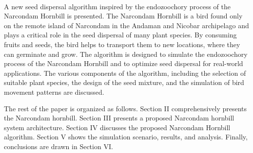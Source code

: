 \documentclass[conference]{IEEEtran}
\begin{document}
\\A new seed dispersal algorithm inspired by the endozoochory process of the Narcondam Hornbill\cite{4} is presented. The Narcondam Hornbill is a bird found only on the remote island of Narcondam in the Andaman and Nicobar archipelago and plays a critical role in the seed dispersal of many plant species. By consuming fruits and seeds, the bird helps to transport them to new locations, where they can germinate and grow. The algorithm is designed to simulate the endozoochory process of the Narcondam Hornbill and to optimize seed dispersal for real-world applications. The various components of the algorithm, including the selection of suitable plant species, the design of the seed mixture, and the simulation of bird movement patterns are discussed.

The rest of the paper is organized as follows. Section II comprehensively presents the Narcondam hornbill. Section III presents a proposed Narcondam hornbill system architecture. Section IV discusses the proposed Narcondam Hornbill algorithm. Section V shows the simulation scenario, results, and analysis. Finally, conclusions are drawn in Section VI.
\end{document}
